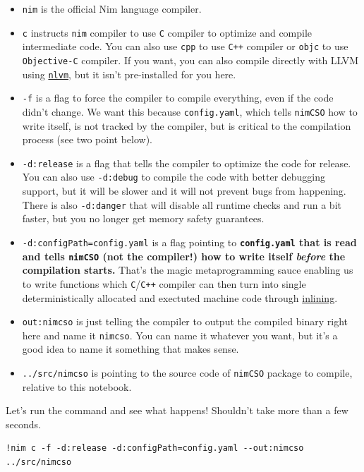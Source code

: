 \begin{itemize}
\item
  \texttt{nim} is the official Nim language compiler.
\item
  \texttt{c} instructs \texttt{nim}
  compiler to use \texttt{C} compiler to optimize and
  compile intermediate code. You can also use
  \texttt{cpp} to use \texttt{C++}
  compiler or \texttt{objc} to use
  \texttt{Objective-C} compiler. If you want, you can
  also compile directly with LLVM using
  \href{https://github.com/arnetheduck/nlvm}{\texttt{nlvm}},
  but it isn't pre-installed for you here.
\item
  \texttt{-f} is a flag to force the compiler to
  compile everything, even if the code didn't change. We want this
  because \texttt{config.yaml}, which tells
  \texttt{nimCSO} how to write itself, is not tracked
  by the compiler, but is critical to the compilation process (see two
  point below).
\item
  \texttt{-d:release} is a flag that tells the compiler
  to optimize the code for release. You can also use
  \texttt{-d:debug} to compile the code with better
  debugging support, but it will be slower and it will not prevent bugs
  from happening. There is also \texttt{-d:danger} that
  will disable all runtime checks and run a bit faster, but you no
  longer get memory safety guarantees.
\item
  \texttt{-d:configPath=config.yaml} is a flag pointing
  to \textbf{\texttt{config.yaml} that is read and
  tells \texttt{nimCSO} (not the compiler!) how to
  write itself \emph{before} the compilation starts.} That's the magic
  metaprogramming sauce enabling us to write functions which
  \texttt{C}/\texttt{C++} compiler can
  then turn into single deterministically allocated and exectuted
  machine code through
  \href{https://en.wikipedia.org/wiki/Inline_expansion}{inlining}.
\item
  \texttt{out:nimcso} is just telling the compiler to
  output the compiled binary right here and name it
  \texttt{nimcso}. You can name it whatever you want,
  but it's a good idea to name it something that makes sense.
\item
  \texttt{../src/nimcso} is pointing to the source code
  of \texttt{nimCSO} package to compile, relative to
  this notebook.
\end{itemize}

Let's run the command and see what happens! Shouldn't take more than a
few seconds.

\begin{verbatim}
!nim c -f -d:release -d:configPath=config.yaml --out:nimcso ../src/nimcso 
\end{verbatim}

